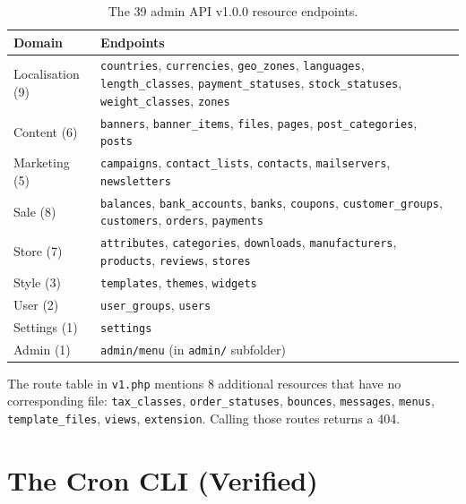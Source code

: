 \documentclass[11pt,a4paper]{article}
\begin{document}
\begin{table}[htbp]
\centering
\caption{The 39 admin API v1.0.0 resource endpoints.}\label{tab:api-surface}
\footnotesize\sloppy
\begin{tabularx}{\columnwidth}{lX}
\toprule
\textbf{Domain} & \textbf{Endpoints} \\
\midrule
Localisation (9) & \texttt{countries}, \texttt{currencies}, \texttt{geo\_zones}, \texttt{languages}, \texttt{length\_classes}, \texttt{payment\_statuses}, \texttt{stock\_statuses}, \texttt{weight\_classes}, \texttt{zones} \\
Content (6)      & \texttt{banners}, \texttt{banner\_items}, \texttt{files}, \texttt{pages}, \texttt{post\_categories}, \texttt{posts} \\
Marketing (5)    & \texttt{campaigns}, \texttt{contact\_lists}, \texttt{contacts}, \texttt{mailservers}, \texttt{newsletters} \\
Sale (8)         & \texttt{balances}, \texttt{bank\_accounts}, \texttt{banks}, \texttt{coupons}, \texttt{customer\_groups}, \texttt{customers}, \texttt{orders}, \texttt{payments} \\
Store (7)        & \texttt{attributes}, \texttt{categories}, \texttt{downloads}, \texttt{manufacturers}, \texttt{products}, \texttt{reviews}, \texttt{stores} \\
Style (3)        & \texttt{templates}, \texttt{themes}, \texttt{widgets} \\
User (2)         & \texttt{user\_groups}, \texttt{users} \\
Settings (1)     & \texttt{settings} \\
Admin (1)        & \texttt{admin/menu} (in \texttt{admin/} subfolder) \\
\bottomrule
\end{tabularx}
\end{table}

The route table in \texttt{v1.php} mentions 8 additional resources
that have no corresponding file: \texttt{tax\_classes},
\texttt{order\_statuses}, \texttt{bounces}, \texttt{messages},
\texttt{menus}, \texttt{template\_files}, \texttt{views},
\texttt{extension}. Calling those routes returns a 404.

\section{The Cron CLI (Verified)}\label{sec:cron-source}
\end{document}
